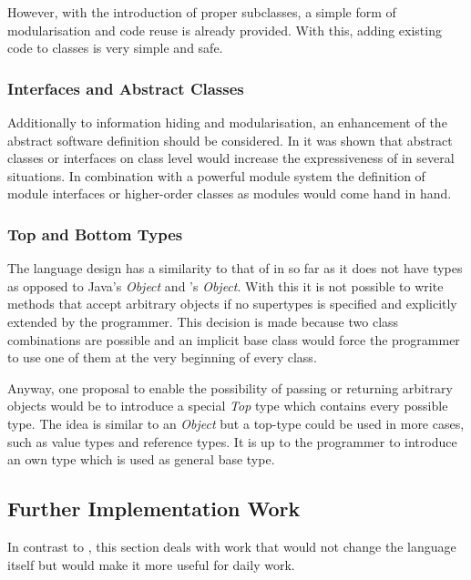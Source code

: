 However, with the introduction of proper subclasses, a simple form of
modularisation and code reuse is already provided. With this, adding
existing code to classes is very simple and safe.

\subsubsection{Interfaces and Abstract Classes}
Additionally to information hiding and modularisation, an
enhancement of the abstract software definition should be considered. In
 it was shown that abstract classes or
interfaces on class level would increase the expressiveness of \ooplss
in several situations. In combination with a powerful module system
the definition of module interfaces or higher-order classes as modules
would come hand in hand.

\subsubsection{Top and Bottom Types}
The language design has a similarity to that of \cpp in so far as it
does not have types as opposed to Java's \emph{Object} and \cs's \emph
{Object}. With this it is not possible to write methods that accept
arbitrary objects if no supertypes is specified and explicitly extended
by the programmer. This decision is made because two class combinations
are possible and an implicit base class would force the programmer to
use one of them at the very beginning of every class.

Anyway, one proposal to enable the possibility of passing or returning
arbitrary objects would be to introduce a special \emph{Top} type which
contains every possible type. The idea is similar to an \emph{Object}
but a top-type could be used in more cases, such as value types and reference
types. It is up to the programmer to introduce an own type
which is used as general base type.


\subsection{Further Implementation Work}
In contrast to , this section deals with work that
would not change the language itself but would make it more useful
for daily work.

